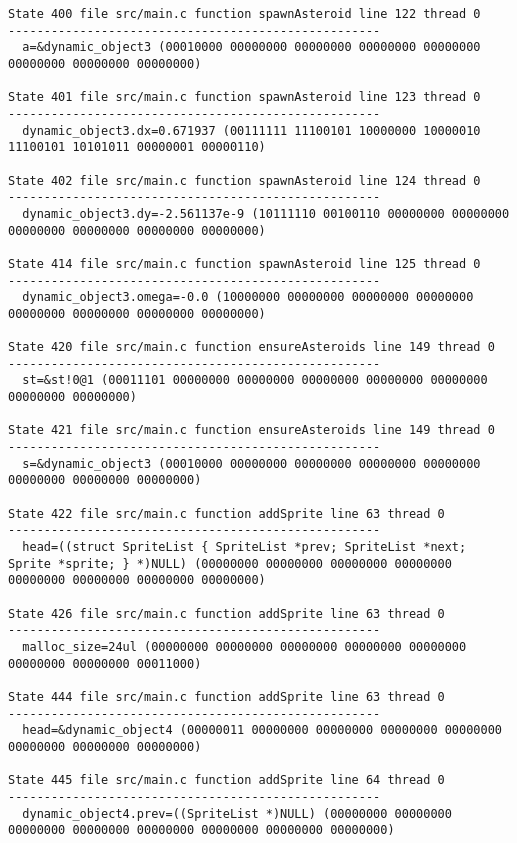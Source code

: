 \begin{verbatim}
State 400 file src/main.c function spawnAsteroid line 122 thread 0
----------------------------------------------------
  a=&dynamic_object3 (00010000 00000000 00000000 00000000 00000000 00000000 00000000 00000000)

State 401 file src/main.c function spawnAsteroid line 123 thread 0
----------------------------------------------------
  dynamic_object3.dx=0.671937 (00111111 11100101 10000000 10000010 11100101 10101011 00000001 00000110)

State 402 file src/main.c function spawnAsteroid line 124 thread 0
----------------------------------------------------
  dynamic_object3.dy=-2.561137e-9 (10111110 00100110 00000000 00000000 00000000 00000000 00000000 00000000)

State 414 file src/main.c function spawnAsteroid line 125 thread 0
----------------------------------------------------
  dynamic_object3.omega=-0.0 (10000000 00000000 00000000 00000000 00000000 00000000 00000000 00000000)

State 420 file src/main.c function ensureAsteroids line 149 thread 0
----------------------------------------------------
  st=&st!0@1 (00011101 00000000 00000000 00000000 00000000 00000000 00000000 00000000)

State 421 file src/main.c function ensureAsteroids line 149 thread 0
----------------------------------------------------
  s=&dynamic_object3 (00010000 00000000 00000000 00000000 00000000 00000000 00000000 00000000)

State 422 file src/main.c function addSprite line 63 thread 0
----------------------------------------------------
  head=((struct SpriteList { SpriteList *prev; SpriteList *next; Sprite *sprite; } *)NULL) (00000000 00000000 00000000 00000000 00000000 00000000 00000000 00000000)

State 426 file src/main.c function addSprite line 63 thread 0
----------------------------------------------------
  malloc_size=24ul (00000000 00000000 00000000 00000000 00000000 00000000 00000000 00011000)

State 444 file src/main.c function addSprite line 63 thread 0
----------------------------------------------------
  head=&dynamic_object4 (00000011 00000000 00000000 00000000 00000000 00000000 00000000 00000000)

State 445 file src/main.c function addSprite line 64 thread 0
----------------------------------------------------
  dynamic_object4.prev=((SpriteList *)NULL) (00000000 00000000 00000000 00000000 00000000 00000000 00000000 00000000)


\end{verbatim}
